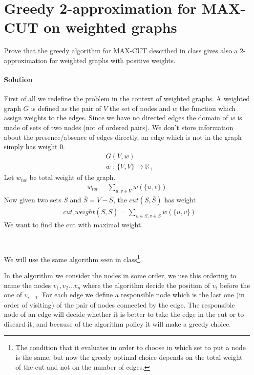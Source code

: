 \documentclass[a4paper]{article}
\begin{document}
\section*{Greedy  2-approximation  for  MAX-CUT  on  weighted  graphs}
Prove that the greedy algorithm for MAX-CUT described in class gives also a 2-approximation for weighted graphs with positive weights.
\\
\\
\textbf{Solution}
\\
\\
First of all we redefine the problem in the context of weighted graphs.
A weighted graph $G$ is defined as the pair of $V$ the set of nodes and $w$ the function which assign weights to the edges.
Since we have no directed edges the domain of $w$ is made of sets of two nodes (not of ordered pairs).
We don't store information about the presence/absence of edges directly, an edge which is not in the graph simply has weight $0$.
\begin{align*}
&G(V, w)\\
&w\ : \ \{V, V\} \longrightarrow \mathbb{R}_+
\end{align*}
Let $w_{tot}$ be total weight of the graph.
\begin{align*}
w_{tot} = \sum_{u, v \in V} w(\{u, v\})
\end{align*}
Now given two sets $S$ and $\bar{S} = V - S$, the $cut(S, \bar{S})$ has weight
\begin{align*}
&cut\_weight(S, \bar{S})= \sum_{u \in S, v \in \bar{S}} w(\{u, v\})
\end{align*}
We want to find the cut with maximal weight.

\

\noindent
We will use the same algorithm seen in class\footnote{
The condition that it evaluates in order to choose in which set to put a node is the same, but now the greedy optimal choice depends on the total weight of the cut and not on the number of edges.}.

In the algorithm we consider the nodes in some order, we use this ordering to name the nodes $v_1, v_2 \dots v_n$ where the algorithm decide the position of $v_i$ before the one of $v_{i+1}$.
For each edge we define a responsible node which is the last one (in order of visiting) of the pair of nodes connected by the edge.
The responsible node of an edge will decide whether it is better to take the edge in the cut or to discard it, and because of the algorithm policy it will make a greedy choice.
\end{document}
